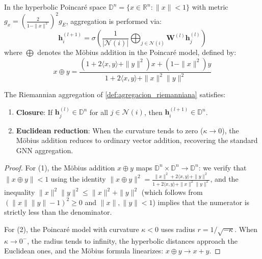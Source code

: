 \begin{definition}\label{def:agregacion_riemanniana}
In the hyperbolic Poincaré space $\mathbb{D}^n = \{x \in \mathbb{R}^n : \|x\| < 1\}$ with metric $g_x = \left(\frac{2}{1 - \|x\|^2}\right)^2 g_E$, aggregation is performed via:
\begin{equation}
\mathbf{h}_i^{(l+1)} = \sigma\left(\frac{1}{|\mathcal{N}(i)|} \bigoplus_{j \in \mathcal{N}(i)} \mathbf{W}^{(l)} \mathbf{h}_j^{(l)}\right)
\end{equation}
where $\bigoplus$ denotes the Möbius addition in the Poincaré model, defined by:
\begin{equation}
x \oplus y = \frac{(1 + 2\langle x, y \rangle + \|y\|^2)x + (1 - \|x\|^2)y}{1 + 2\langle x, y \rangle + \|x\|^2\|y\|^2}
\end{equation}
\end{definition}

\begin{proposition}\label{prop:consistencia_agregacion_riemanniana}
The Riemannian aggregation of \autoref{def:agregacion_riemanniana} satisfies:
\begin{enumerate}
    \item \textbf{Closure}: If $\mathbf{h}_j^{(l)} \in \mathbb{D}^n$ for all $j \in \mathcal{N}(i)$, then $\mathbf{h}_i^{(l+1)} \in \mathbb{D}^n$.
    \item \textbf{Euclidean reduction}: When the curvature tends to zero ($\kappa \to 0$), the Möbius addition reduces to ordinary vector addition, recovering the standard GNN aggregation.
\end{enumerate}
\end{proposition}

\begin{proof}
For (1), the Möbius addition $x \oplus y$ maps $\mathbb{D}^n \times \mathbb{D}^n \to \mathbb{D}^n$: we verify that $\|x \oplus y\| < 1$ using the identity $\|x \oplus y\|^2 = \frac{\|x\|^2 + 2\langle x,y\rangle + \|y\|^2}{1 + 2\langle x,y\rangle + \|x\|^2\|y\|^2}$, and the inequality $\|x\|^2\|y\|^2 \leq \|x\|^2 + \|y\|^2$ (which follows from $(\|x\|\|y\| - 1)^2 \geq 0$ and $\|x\|, \|y\| < 1$) implies that the numerator is strictly less than the denominator.

For (2), the Poincaré model with curvature $\kappa < 0$ uses radius $r = 1/\sqrt{-\kappa}$. When $\kappa \to 0^-$, the radius tends to infinity, the hyperbolic distances approach the Euclidean ones, and the Möbius formula linearizes: $x \oplus y \to x + y$.
\end{proof}

